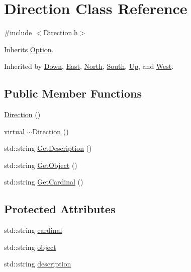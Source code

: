 \hypertarget{class_direction}{}\section{Direction Class Reference}
\label{class_direction}


{\ttfamily \#include $<$Direction.\+h$>$}



Inherits \mbox{\hyperlink{class_option}{Option}}.



Inherited by \mbox{\hyperlink{class_down}{Down}}, \mbox{\hyperlink{class_east}{East}}, \mbox{\hyperlink{class_north}{North}}, \mbox{\hyperlink{class_south}{South}}, \mbox{\hyperlink{class_up}{Up}}, and \mbox{\hyperlink{class_west}{West}}.

\subsection*{Public Member Functions}
\begin{DoxyCompactItemize}
\item 
\mbox{\hyperlink{class_direction_aba0c848f9db9831e6feb64d978e6d019}{Direction}} ()
\item 
virtual \mbox{\hyperlink{class_direction_a9dc10040126d32d44f5e683ec940e3cd}{$\sim$\+Direction}} ()
\item 
std\+::string \mbox{\hyperlink{class_direction_a4cc685fd6eb1cae755be2d93fab59e30}{Get\+Description}} ()
\item 
std\+::string \mbox{\hyperlink{class_direction_aa2af9a792292868d283537fc94469894}{Get\+Object}} ()
\item 
std\+::string \mbox{\hyperlink{class_direction_a267ec83b0dbc81a5fb6fbb4c675c3d87}{Get\+Cardinal}} ()
\end{DoxyCompactItemize}
\subsection*{Protected Attributes}
\begin{DoxyCompactItemize}
\item 
std\+::string \mbox{\hyperlink{class_direction_afaa40fc2f8cbd9e9a14a9e2d80920f56}{cardinal}}
\item 
std\+::string \mbox{\hyperlink{class_direction_a7be78cb6b0af751a6cfa0808dc91cd6e}{object}}
\item 
std\+::string \mbox{\hyperlink{class_direction_a6fe5ae36646ffd423ba6b5ea927de6ca}{description}}
\end{DoxyCompactItemize}


